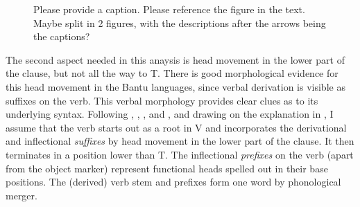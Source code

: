 \documentclass[output=paper
,modfonts
,nonflat]{langsci/langscibook}
\begin{document}
\begin{figure}
	\caption{\color{red}Please provide a caption. Please reference the figure in the text. Maybe split in 2 figures, with the descriptions after the arrows being the captions?}
	\begin{exe}
\end{exe}
\end{figure} 

The second aspect needed in this anaysis is head movement in the lower part of the clause, but not all the way to T. There is good morphological evidence for this head movement in the Bantu languages, since verbal derivation is visible as suffixes on the verb. This verbal morphology provides clear clues as to its underlying syntax. Following \citet{Myers1990}, \citet{Julien2002}, \citet{Kinyalolo2003}, and \citet{Buell2005}, and drawing on the explanation in \citet{Van_der_Wal2009}, I assume that the verb starts out as a root in V and incorporates the derivational and inflectional \textit{suffixes} by head movement in the lower part of the clause. It then terminates in a position lower than T. The inflectional \textit{prefixes} on the verb (apart from the object marker) represent functional heads spelled out in their base positions. The (derived) verb stem and prefixes form one word by phonological merger.
\end{document}
